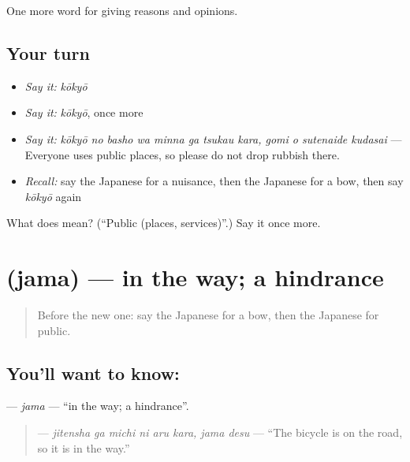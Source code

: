 \begin{grammarlens}[title={What you've built}]
One more word for giving reasons and opinions.
\end{grammarlens}

\subsection*{Your turn}
\begin{itemize}
\raggedright
  \item \emph{Say it:} \emph{kōkyō}
  \item \emph{Say it:} \emph{kōkyō}, once more
  \item \emph{Say it:} \emph{kōkyō no basho wa minna ga tsukau kara, gomi o sutenaide kudasai} — Everyone uses public places, so please do not drop rubbish there.
  \item \emph{Recall:} say the Japanese for a nuisance, then the Japanese for a bow, then say \emph{kōkyō} again
\end{itemize}

\begin{tcolorbox}[breakable,colback=teal!4,colframe=teal!35!black,title={Before you move on}]
What does  mean? (\textquotedblleft{}Public (places, services)\textquotedblright{}.) Say it once more.
\end{tcolorbox}
\section[\texorpdfstring{\ja{じゃま} (jama)}{じゃま (jama)}]{ (jama) — in the way; a hindrance}

\label{lesson:JA-C328-jama}



\begin{quote}
Before the new one: say the Japanese for a bow, then the Japanese for public.
\end{quote}

\subsection*{You'll want to know: }
\textbf{} — \emph{jama} — \textquotedblleft{}in the way; a hindrance\textquotedblright{}.

\begin{quote}
\textbf{  } — \emph{jitensha ga michi ni aru kara, jama desu} — \textquotedblleft{}The bicycle is on the road, so it is in the way.\textquotedblright{}
\end{quote}

